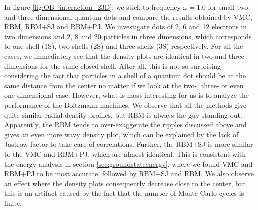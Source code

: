 In figure \eqref{fig:OB_interaction_23D}, we stick to frequency $\omega=1.0$ for small two- and three-dimensional quantum dots and compare the results obtained by VMC, RBM, RBM+SJ and RBM+PJ. We investigate dots of 2, 6 and 12 electrons in two dimensions and 2, 8 and 20 particles in three dimensions, which corresponds to one shell (1S), two shells (2S) and three shells (3S) respectively. For all the cases, we immediately see that the density plots are identical in two and three dimensions for the same closed shell. After all, this is not so surprising considering the fact that particles in a shell of a quantum dot should be at the same distance from the center no matter if we look at the two-, three- or even one-dimensional case. However, what is most interesting for us is to analyze the performance of the Boltzmann machines. We observe that all the methods give quite similar radial density profiles, but RBM is always the guy standing out. Apparently, the RBM tends to over-exaggerate the ripples discussed above and gives an even more wavy density plot, which can be explained by the lack of Jastrow factor to take care of correlations. Further, the RBM+SJ is more similar to the VMC and RBM+PJ, which are almost identical. This is consistent with the energy analysis in section \ref{sec:groundstateenergy}, where we found VMC and RBM+PJ to be most accurate, followed by RBM+SJ and RBM. We also observe an effect where the density plots consequently decrease close to the center, but this is an artifact caused by the fact that the number of Monte Carlo cycles is finite. 

